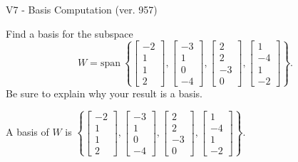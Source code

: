 \begin{exercise}
  \begin{exerciseTitle}V7 - Basis Computation (ver. 957)\end{exerciseTitle}
  \begin{exerciseStatement}
    Find a basis for the subspace 
\[W=\mathrm{span}\ \left\{\left[\begin{array}{r}
-2 \\
1 \\
1 \\
2
\end{array}\right] , \left[\begin{array}{r}
-3 \\
1 \\
0 \\
-4
\end{array}\right] , \left[\begin{array}{r}
2 \\
2 \\
-3 \\
0
\end{array}\right] , \left[\begin{array}{r}
1 \\
-4 \\
1 \\
-2
\end{array}\right]\right\}.\]
 Be sure to explain why your result is a basis.


  \end{exerciseStatement}
  \begin{exerciseAnswer}
   A basis of \(W\) is  \(\left\{\left[\begin{array}{r}
-2 \\
1 \\
1 \\
2
\end{array}\right] , \left[\begin{array}{r}
-3 \\
1 \\
0 \\
-4
\end{array}\right] , \left[\begin{array}{r}
2 \\
2 \\
-3 \\
0
\end{array}\right] , \left[\begin{array}{r}
1 \\
-4 \\
1 \\
-2
\end{array}\right]\right\}\).
  


  \end{exerciseAnswer}
\end{exercise}